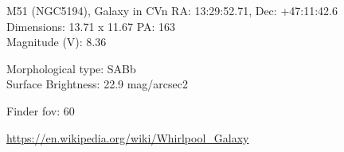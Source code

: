 \begin{block}{M51 (NGC5194), Galaxy in CVn}
    RA: 13:29:52.71, Dec: +47:11:42.6 \\ 
    Dimensions: 13.71 x 11.67 PA: 163 \\ 
    Magnitude (V): 8.36

    Morphological type: SABb \\ 
    Surface Brightness: 22.9 mag/arcsec2 


    Finder fov: 60 

    \url{https://en.wikipedia.org/wiki/Whirlpool_Galaxy} 
\end{block}